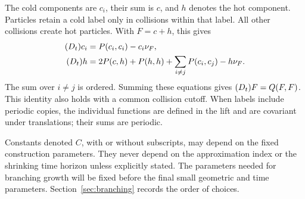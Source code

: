 The cold components are \(c_i\), their sum is \(c\), and \(h\) denotes
the hot component. Particles retain a cold label only in collisions
within that label. All other collisions create hot particles. With
\(F=c+h\), this gives
\begin{equation}\label{eq:colored}
\begin{split}
(D_t)c_i&=P(c_i,c_i)-c_i\nu_F,\\
(D_t)h&=2P(c,h)+P(h,h)+\sum_{i\ne j}P(c_i,c_j)-h\nu_F.
\end{split}
\end{equation}
The sum over \(i\ne j\) is ordered. Summing these equations gives
\((D_t)F=Q(F,F)\). This identity also holds with a common collision cutoff.
When labels include periodic copies, the individual functions are defined
in the lift and are covariant under translations; their sums are periodic.

Constants denoted \(C\), with or without subscripts, may depend on the
fixed construction parameters. They never depend on the approximation
index or the shrinking time horizon unless explicitly stated. The
parameters needed for branching growth will be fixed before the final
small geometric and time parameters. Section~\ref{sec:branching} records
the order of choices.
